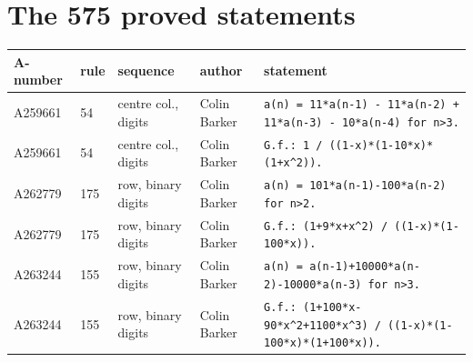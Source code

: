 \documentclass[11pt]{article}
\theoremstyle{definition}
\theoremstyle{remark}
\begin{document}
\appendix
\section{The 575 proved statements}\label{app:proved}
{\small
\begin{longtable}{p{1.3cm}p{0.7cm}p{2.4cm}p{2.3cm}p{7.3cm}}
\toprule A-number & rule & sequence & author & statement\\\midrule\endhead
A259661 & 54 & centre col., digits & Colin Barker & \texttt{a(n)\allowbreak{} \allowbreak{}=\allowbreak{} \allowbreak{}11*\allowbreak{}a(n-\allowbreak{}1)\allowbreak{} \allowbreak{}-\allowbreak{} \allowbreak{}11*\allowbreak{}a(n-\allowbreak{}2)\allowbreak{} \allowbreak{}+\allowbreak{} \allowbreak{}11*\allowbreak{}a(n-\allowbreak{}3)\allowbreak{} \allowbreak{}-\allowbreak{} \allowbreak{}10*\allowbreak{}a(n-\allowbreak{}4)\allowbreak{} \allowbreak{}for \allowbreak{}n>3.} \\
A259661 & 54 & centre col., digits & Colin Barker & \texttt{G.f.: \allowbreak{}1 \allowbreak{}/\allowbreak{} \allowbreak{}((1-\allowbreak{}x)\allowbreak{}*\allowbreak{}(1-\allowbreak{}10*\allowbreak{}x)\allowbreak{}*\allowbreak{}(1+\allowbreak{}x\^{}2)\allowbreak{})\allowbreak{}.} \\
A262779 & 175 & row, binary digits & Colin Barker & \texttt{a(n)\allowbreak{} \allowbreak{}=\allowbreak{} \allowbreak{}101*\allowbreak{}a(n-\allowbreak{}1)\allowbreak{}-\allowbreak{}100*\allowbreak{}a(n-\allowbreak{}2)\allowbreak{} \allowbreak{}for \allowbreak{}n>2.} \\
A262779 & 175 & row, binary digits & Colin Barker & \texttt{G.f.: \allowbreak{}(1+\allowbreak{}9*\allowbreak{}x+\allowbreak{}x\^{}2)\allowbreak{} \allowbreak{}/\allowbreak{} \allowbreak{}((1-\allowbreak{}x)\allowbreak{}*\allowbreak{}(1-\allowbreak{}100*\allowbreak{}x)\allowbreak{})\allowbreak{}.} \\
A263244 & 155 & row, binary digits & Colin Barker & \texttt{a(n)\allowbreak{} \allowbreak{}=\allowbreak{} \allowbreak{}a(n-\allowbreak{}1)\allowbreak{}+\allowbreak{}10000*\allowbreak{}a(n-\allowbreak{}2)\allowbreak{}-\allowbreak{}10000*\allowbreak{}a(n-\allowbreak{}3)\allowbreak{} \allowbreak{}for \allowbreak{}n>3.} \\
A263244 & 155 & row, binary digits & Colin Barker & \texttt{G.f.: \allowbreak{}(1+\allowbreak{}100*\allowbreak{}x-\allowbreak{}90*\allowbreak{}x\^{}2+\allowbreak{}1100*\allowbreak{}x\^{}3)\allowbreak{} \allowbreak{}/\allowbreak{} \allowbreak{}((1-\allowbreak{}x)\allowbreak{}*\allowbreak{}(1-\allowbreak{}100*\allowbreak{}x)\allowbreak{}*\allowbreak{}(1+\allowbreak{}100*\allowbreak{}x)\allowbreak{})\allowbreak{}.} \\

\end{longtable}}
\end{document}
